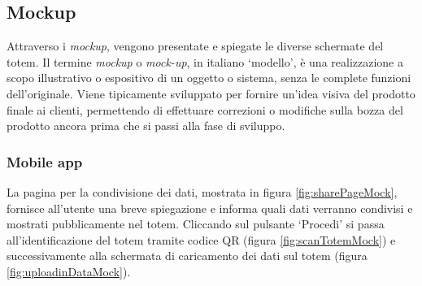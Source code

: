 \subsection{Mockup}
Attraverso i \textit{mockup}, vengono presentate e spiegate le diverse schermate del totem.
Il termine \textit{mockup} o \textit{mock-up}, in italiano \enquote*{modello}, è una realizzazione a scopo illustrativo o espositivo di un oggetto o sistema, senza le complete funzioni dell'originale. Viene tipicamente sviluppato per fornire un'idea visiva del prodotto finale ai clienti, permettendo di effettuare correzioni o modifiche sulla bozza del prodotto ancora prima che si passi alla fase di sviluppo.

\subsubsection{Mobile app}
La pagina per la condivisione dei dati, mostrata in figura \ref{fig:sharePageMock}, fornisce all'utente una breve spiegazione e informa quali dati verranno condivisi e mostrati pubblicamente nel totem.
Cliccando sul pulsante \enquote*{Procedi} si passa all'identificazione del totem tramite codice QR (figura \ref{fig:scanTotemMock}) e successivamente alla schermata di caricamento dei dati sul totem (figura \ref{fig:uploadinDataMock}).
